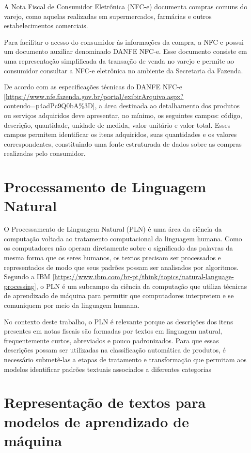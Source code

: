 \documentclass[twoside,english,brazilian]{UNISINOSmonografia}
\begin{document}
A Nota Fiscal de Consumidor Eletrônica (NFC-e) documenta compras comuns do varejo, como aquelas realizadas em supermercados, farmácias e outros estabelecimentos comerciais.

Para facilitar o acesso do consumidor às informações da compra, a NFC-e possui um documento auxiliar denominado DANFE NFC-e. Esse documento consiste em uma representação simplificada da transação de venda no varejo e permite ao consumidor consultar a NFC-e eletrônica no ambiente da Secretaria da Fazenda.

De acordo com as especificações técnicas do DANFE NFC-e [\url{https://www.nfe.fazenda.gov.br/portal/exibirArquivo.aspx?conteudo=p4adPc9Q0bA\%3D}], a área destinada ao detalhamento dos produtos ou serviços adquiridos deve apresentar, no mínimo, os seguintes campos: código, descrição, quantidade, unidade de medida, valor unitário e valor total. Esses campos permitem identificar os itens adquiridos, suas quantidades e os valores correspondentes, constituindo uma fonte estruturada de dados sobre as compras realizadas pelo consumidor.

\section{Processamento de Linguagem Natural}

O Processamento de Linguagem Natural (PLN) é uma área da ciência da computação voltada ao tratamento computacional da linguagem humana. Como os computadores não operam diretamente sobre o significado das palavras da mesma forma que os seres humanos, os textos precisam ser processados e representados de modo que seus padrões possam ser analisados por algoritmos. Segundo a IBM [\url{https://www.ibm.com/br-pt/think/topics/natural-language-processing}], o PLN é um subcampo da ciência da computação que utiliza técnicas de aprendizado de máquina para permitir que computadores interpretem e se comuniquem por meio da linguagem humana.

No contexto deste trabalho, o PLN é relevante porque as descrições dos itens presentes em notas fiscais são formadas por textos em linguagem natural, frequentemente curtos, abreviados e pouco padronizados. Para que essas descrições possam ser utilizadas na classificação automática de produtos, é necessário submetê-las a etapas de tratamento e transformação que permitam aos modelos identificar padrões textuais associados a diferentes categorias

\section{Representação de textos para modelos de aprendizado de máquina}
\end{document}
